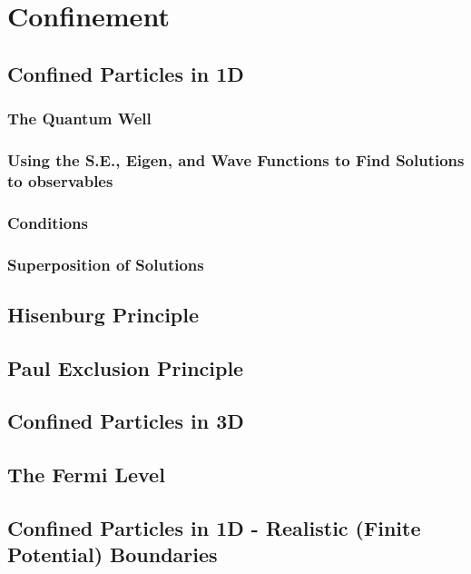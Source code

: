 \documentclass[colorlinks,11pt,a4paper,normalphoto,withhyper,ragged2e]{altareport}
\begin{document}
	
	\pagebreak
	
	
	
	
\section{Confinement}
	
	\subsection{Confined Particles in 1D}
		
		\subsubsection{The Quantum Well}
		
		
		\subsubsection{Using the S.E., Eigen, and Wave Functions to Find Solutions to observables}
		
		
		\subsubsection{Conditions}
		
		
		\subsubsection{Superposition of Solutions}
		
		
	\subsection{Hisenburg Principle}
	
	
	\subsection{Paul Exclusion Principle}
	
	
	\subsection{Confined Particles in 3D}
	
	
	\subsection{The Fermi Level}
	
	
	\subsection{Confined Particles in 1D - Realistic (Finite Potential) Boundaries}
	
\end{document}
